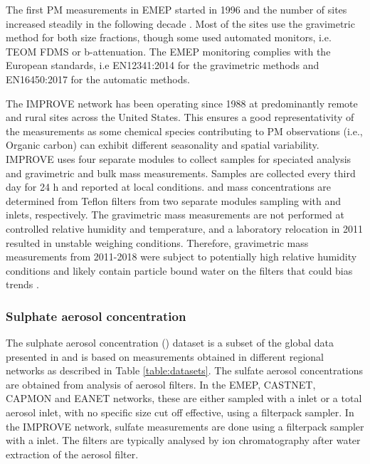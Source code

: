 \documentclass[acp, manuscript]{copernicus}
\begin{document}
The first PM measurements in EMEP started in 1996 and the number of sites increased steadily in the following decade \citep{torseth2012}. Most of the sites use the gravimetric method for both size fractions, though some used automated monitors, i.e. TEOM FDMS or b-attenuation. The EMEP monitoring complies with the European standards, i.e EN12341:2014 for the gravimetric methods and  EN16450:2017 for the automatic methods.

The IMPROVE network has been operating since 1988 at predominantly remote and rural sites across the United States. This ensures a good representativity of the measurements as some chemical species contributing to PM observations (i.e., Organic carbon) can exhibit different seasonality and spatial variability. IMPROVE uses four separate modules to collect samples for speciated  analysis and gravimetric  and  bulk mass measurements. Samples are collected every third day for 24 h and reported at local conditions.  and  mass concentrations are determined from Teflon filters from two separate modules sampling with  and  inlets, respectively. The gravimetric mass measurements are not performed at controlled relative humidity and temperature, and a laboratory relocation in 2011 resulted in unstable weighing conditions. Therefore, gravimetric mass measurements from 2011-2018 were subject to potentially high relative humidity conditions and likely contain particle bound water on the filters that could bias trends \citep{Hand2019}.

\subsubsection{Sulphate aerosol concentration}
 The sulphate aerosol concentration () dataset is a subset of the global data presented in \cite{aas2019global} and is based on measurements obtained in different regional networks as described in Table \ref{table:datasets}. The sulfate aerosol concentrations are obtained from analysis of aerosol filters. In the EMEP, CASTNET, CAPMON and EANET networks, these are either sampled with a  inlet or a total aerosol inlet, with no specific size cut off effective, using a filterpack sampler.  In the IMPROVE network, sulfate measurements are done using a filterpack sampler with a  inlet. The filters are typically analysed by ion chromatography after water extraction of the aerosol filter.
\end{document}
